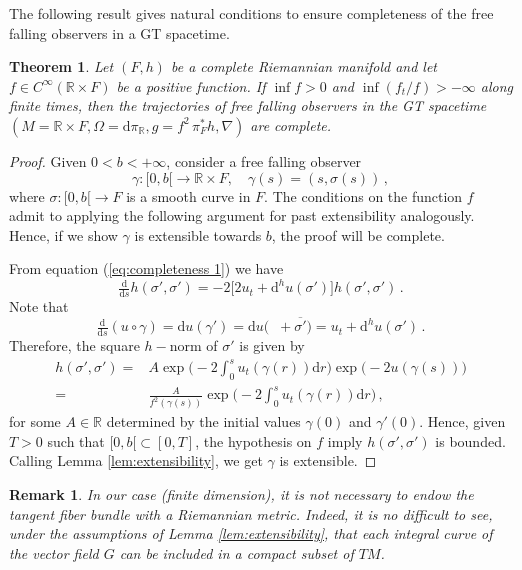 \documentclass[12pt]{article}
\newcommand{\diff}{\mathrm{d}}
\newcommand{\ds}{\diff s}
\DeclareMathOperator{\pt}{\partial_t}
\newtheorem{theor}[defi]{Theorem}
\newtheorem{rem}[defi]{Remark}
\def\R{\mathbb R}
\begin{document}
The following result gives natural conditions to ensure completeness of the free falling observers in a GT spacetime. 
\begin{theor}\label{theor:completeness free falling}
    Let $(F,h)$ be a complete Riemannian manifold and let $f\in C^\infty(\R \times F)$ be a positive function. If $\inf f >0$ and $\inf (f_t/f)>-\infty$ along finite times, then the trajectories of free falling observers in the GT spacetime $(M=\R\times F, \Omega =\diff \pi_\R, g=f^2\, \pi_F^* h, \nabla)$ are complete.
\end{theor}
\begin{proof}
    Given $0<b<+\infty$, consider a free falling observer 
    $$
    \gamma\colon [0,b[ \to \R \times F, \quad \gamma(s) = (s,\sigma(s))\,,
    $$
    where $\sigma\colon [0,b[ \to F$ is a smooth curve in $F$. The conditions on the function $f$ admit to applying the following argument for past extensibility analogously. Hence, if we show $\gamma$ is extensible towards $b$, the proof will be complete. 
    
    From equation (\ref{eq:completeness 1}) we have
    \begin{equation*}
        \tfrac{\diff}{\ds} h(\sigma', \sigma') = -2 \big[ 2u_t+\diff^h u(\sigma') \big] h(\sigma', \sigma')\,.
    \end{equation*}
    Note that 
    $$\tfrac{\diff}{\ds} (u\circ \gamma) = \diff u(\gamma') = \diff u\big(\pt + \overline{\sigma'}\big) = u_t + \diff^h u(\sigma')\,.$$
    Therefore, the square $h-$norm of $\sigma'$ is given by
    \begin{equation}\label{eq:completeness timelike hnorm}
    \begin{split}
        h(\sigma',\sigma') 
        ={}& A \exp\Big(-2\int_{0}^s u_t(\gamma(r)) \diff r\Big) \exp\big(-2 u(\gamma(s))\big)\\
        ={}& \tfrac{A}{f^2 (\gamma(s))} \exp\Big(-2\int_{0}^s u_t(\gamma(r)) \diff r\Big) \,,
    \end{split}        
    \end{equation}
    for some $A\in \R$ determined by the initial values $\gamma(0)$ and $\gamma'(0)$. 
    Hence, given $T>0$ such that $[0,b[\subset [0,T]$, the hypothesis on $f$ imply $h(\sigma',\sigma')$ is bounded. 
    Calling Lemma \ref{lem:extensibility}, we get $\gamma$ is extensible.
\end{proof}

\begin{rem}
\upshape
In our case (finite dimension), it is not necessary to endow the tangent fiber bundle with a Riemannian metric. Indeed, it is no difficult to see, under the assumptions of Lemma \ref{lem:extensibility}, that each integral curve of the vector field $G$ can be included in a compact subset of $TM$. 
\end{rem}
\end{document}
